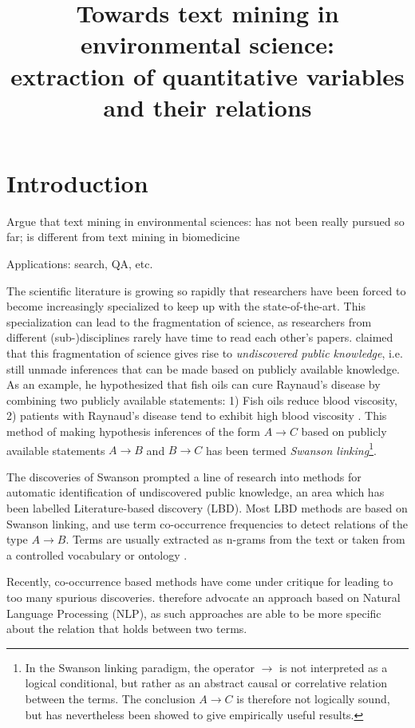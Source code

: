 \documentclass[10pt, a4paper]{article}
\title{Towards text mining in environmental science:\\
extraction of quantitative variables and their relations}
\begin{document}
\maketitleabstract

\section{Introduction}

Argue that text mining in environmental sciences:
has not been really pursued so far;
is different from text mining in biomedicine

Applications: search, QA, etc.

The scientific literature is growing so rapidly that researchers have been forced to become increasingly specialized to keep up with the state-of-the-art. 
This specialization can lead to the fragmentation of science, as researchers from different (sub-)disciplines rarely have time to read each other's papers. 
 claimed that this fragmentation of science gives rise to \emph{undiscovered public knowledge}, i.e. still unmade inferences that can be made based on publicly available knowledge. As an example, he hypothesized that fish oils can cure Raynaud's disease by combining two publicly available statements: 1) Fish oils reduce blood viscosity, 2) patients with Raynaud's disease tend to exhibit high blood viscosity \cite{Swanson1986Fishoil}. 
This method of making hypothesis inferences of the form $A \to C$ based on publicly available statements $A \to B$ and $B \to C$ has been termed \emph{Swanson linking}\footnote{In the Swanson linking paradigm, the operator $\to$ is not interpreted as a logical conditional, but rather as an abstract causal or correlative relation between the terms. The conclusion $A \to C$ is therefore not logically sound, but has nevertheless been showed to give empirically useful results.}. 

The discoveries of Swanson prompted a line of research into methods for automatic identification of undiscovered public knowledge, an area which has been labelled Literature-based discovery (LBD). 
Most LBD methods are based on Swanson linking, and use term co-occurrence frequencies to detect relations of the type $A \to B$. 
Terms are usually extracted as n-grams from the text \cite{Lindsay1999LBDLexicalStat} or taken from a controlled vocabulary or ontology \cite{Weeber2001ConceptsInLBD}.

Recently, co-occurrence based methods have come under critique for leading to too many spurious discoveries.
 therefore advocate an approach based on Natural Language Processing (NLP), as such approaches are able to be more specific about the relation that holds between two terms. 
\end{document}

